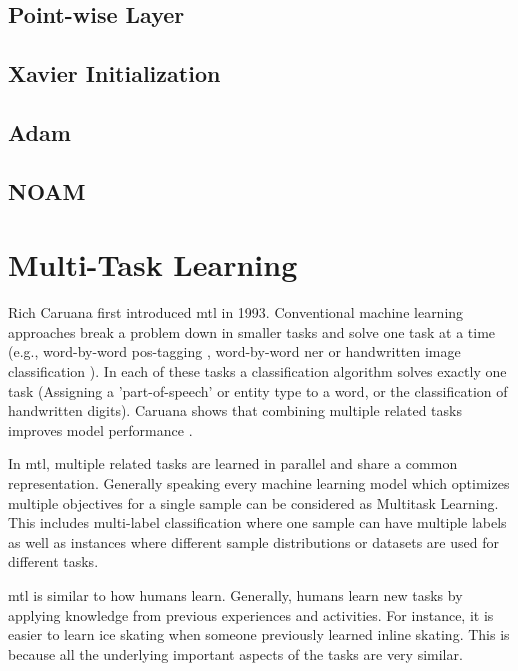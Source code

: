 \subsection{Point-wise Layer}

\subsection{Xavier Initialization}

\subsection{Adam}

\subsection{NOAM}

\section{Multi-Task Learning}

Rich Caruana first introduced \acrfull{mtl} in 1993. Conventional machine learning approaches break a problem down in smaller tasks and solve one task at a time (e.g., word-by-word \gls{pos}-tagging \cite{Toutanova2007}, word-by-word \gls{ner} \cite{Sang2003} or handwritten image classification \cite{LeCun;1990}). In each of these tasks a classification algorithm solves exactly one task (Assigning a 'part-of-speech' or entity type to a word, or the classification of handwritten digits). Caruana shows that combining multiple related tasks improves model performance \cite{Caruana1993}\cite{Caruana1997a}. 

In \gls{mtl}, multiple related tasks are learned in parallel and share a common representation. Generally speaking every machine learning model which optimizes multiple objectives for a single sample can be considered as Multitask Learning. This includes multi-label classification where one sample can have multiple labels as well as instances where different sample distributions or datasets are used for different tasks.

\gls{mtl} is similar to how humans learn. Generally, humans learn new tasks by applying knowledge from previous experiences and activities. For instance, it is easier to learn ice skating when someone previously learned inline skating. This is because all the underlying important aspects of the tasks are very similar.

